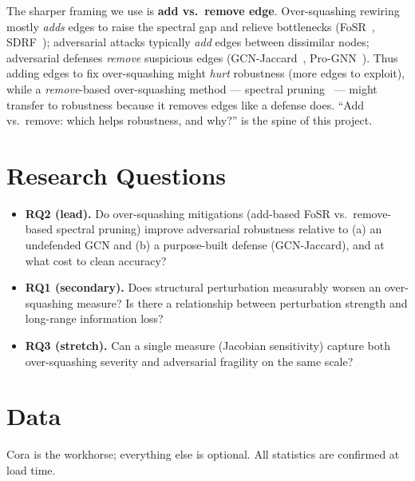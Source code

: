 \documentclass[10pt]{article}
\begin{document}
The sharper framing we use is \textbf{add vs.\ remove edge}. Over-squashing rewiring mostly
\emph{adds} edges to raise the spectral gap and relieve bottlenecks (FoSR~\citep{karhadkar2023fosr},
SDRF~\citep{topping2022understanding}); adversarial attacks typically \emph{add} edges between
dissimilar nodes; adversarial defenses \emph{remove} suspicious edges (GCN-Jaccard~\citep{wu2019jaccard},
Pro-GNN~\citep{jin2020prognn}). Thus adding edges to fix over-squashing might \emph{hurt} robustness
(more edges to exploit), while a \emph{remove}-based over-squashing method --- spectral
pruning~\citep{jamadandi2024spectral} --- might transfer to robustness because it removes edges like a
defense does. ``Add vs.\ remove: which helps robustness, and why?'' is the spine of this project.

\section{Research Questions}
\begin{itemize}
  \item \textbf{RQ2 (lead).} Do over-squashing mitigations (add-based FoSR vs.\ remove-based spectral
  pruning) improve adversarial robustness relative to (a) an undefended GCN and (b) a purpose-built
  defense (GCN-Jaccard), and at what cost to clean accuracy?
  \item \textbf{RQ1 (secondary).} Does structural perturbation measurably worsen an over-squashing
  measure? Is there a relationship between perturbation strength and long-range information loss?
  \item \textbf{RQ3 (stretch).} Can a single measure (Jacobian sensitivity) capture both
  over-squashing severity and adversarial fragility on the same scale?
\end{itemize}

\section{Data}
Cora is the workhorse; everything else is optional. All statistics are confirmed at load time.
\end{document}
